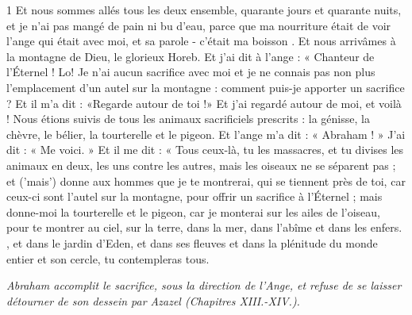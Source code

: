 
\par 1 Et nous sommes allés tous les deux ensemble, quarante jours et quarante nuits, et je n'ai pas mangé de pain ni bu d'eau, parce que ma nourriture était de voir l'ange qui était avec moi, et sa parole - c'était ma boisson . Et nous arrivâmes à la montagne de Dieu, le glorieux Horeb. Et j'ai dit à l'ange : « Chanteur de l'Éternel ! Lo! Je n’ai aucun sacrifice avec moi et je ne connais pas non plus l’emplacement d’un autel sur la montagne : comment puis-je apporter un sacrifice ? Et il m'a dit : «Regarde autour de toi !» Et j'ai regardé autour de moi, et voilà ! Nous étions suivis de tous les animaux sacrificiels prescrits : la génisse, la chèvre, le bélier, la tourterelle et le pigeon. Et l’ange m’a dit : « Abraham ! » J'ai dit : « Me voici. » Et il me dit : « Tous ceux-là, tu les massacres, et tu divises les animaux en deux, les uns contre les autres, mais les oiseaux ne se séparent pas ; et ('mais') donne aux hommes que je te montrerai, qui se tiennent près de toi, car ceux-ci sont l'autel sur la montagne, pour offrir un sacrifice à l'Éternel ; mais donne-moi la tourterelle et le pigeon, car je monterai sur les ailes de l'oiseau, pour te montrer au ciel, sur la terre, dans la mer, dans l'abîme et dans les enfers. , et dans le jardin d'Eden, et dans ses fleuves et dans la plénitude du monde entier et son cercle, tu contempleras tous.


\par \textit{Abraham accomplit le sacrifice, sous la direction de l'Ange, et refuse de se laisser détourner de son dessein par Azazel (Chapitres XIII.-XIV.).}

